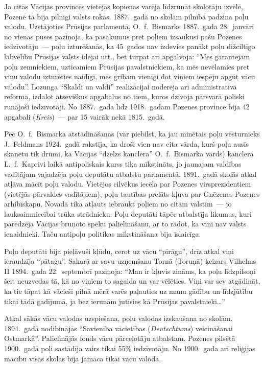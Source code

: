 \documentclass[twoside,a5paper,12pt,fleqn,openany]{extbook}
\newcommand{\detxti}[1]{\textit{\textgerman{#1}}}
\begin{document}
Ja citās Vācijas provincēs vietējās kopienas varēja līdzrunāt skolotāju izvēlē, Pozenē tā bija pilnīgi valsts rokās. 1887.~gadā no skolām pilnībā padzina poļu valodu. Uzstājoties Prūsijas parlamentā, O.~f.~Bismarks 1887.~gada 28.~janvārī no vienas puses paziņoja, ka pasākumus pret poļiem izsaukusi pašu Pozenes iedzīvotāju~--- poļu izturēšanās, ka 45~gados nav izdevies panākt poļu dižciltīgo labvēlību Prūsijas valsts idejai utt., bet turpat arī apgalvoja: ``Mēs garantējam poļu zemniekiem, uzticamiem Prūsijas pavalstniekiem, ka mēs nevēlamies pret viņu valodu izturēties naidīgi, mēs gribam vienīgi dot viņiem iespēju apgūt vācu valodu''. Lozunga ``Skaldi un valdi'' realizācijai noderēja arī administratīvā reforma, izdalot atsevišķus apgabalus no tiem, kuros dzīvoja pārsvarā poliski runājoši iedzīvotāji. No 1887.~gada līdz 1918.~gadam Pozenes provincē bija 42 apgabali (\detxti{Kreis})~--- par 15 vairāk nekā 1815.~gadā.

Pēc O.~f.~Bismarka atstādināšanas (var piebilst, ka jau minētais poļu vēsturnieks J.~Feldmans 1924.~gadā rakstīja, ka droši vien nav cita vārda, kurš poļu ausīs skanētu tik drūmi, kā Vācijas ``dzelzs kanclera'' O.~f.~Bismarka vārds) kanclera L.~f.~Kaprivi laikā antipoliskais kurss tika mīkstināts, jo jaunajam valdības vadītājam vajadzēja poļu deputātu atbalstu parlamentā. 1891.~gadā skolās atkal atļāva mācīt poļu valodu. Vietējos cilvēkus iecēla par Pozenes virsprezidentiem (vietējās pārvaldes vadītājiem), poļu tautības prelāts kļuva par Gnēzenes-Pozenes arhibīskapu. Novadā tika atļauts iebraukt poļiem no citām valstīm~--- jo lauksaimniecībai trūka strādnieku. Poļu deputāti tāpēc atbalstīja likumus, kuri paredzēja Vācijas bruņoto spēku palielināšanu, ar to rādot, ka viņi nav valsts ienaidnieki. Taču antipoļu politikas mīkstināšana bija īslaicīga.

Poļu deputāti bija pieļāvuši kļūdu, cerot uz vācu ``pīrāgu'', drīz atkal viņi ieraudzīja ``pātagu''. Sakarā ar savu uzņemšanu Tornā (Toruņā) ķeizars Vilhelms II 1894.~gada 22.~septembrī paziņoja: ``Man ir kļuvis zināms, ka poļu līdzpilsoņi šeit neuzvedas tā, kā no viņiem to sagaida un var vēlēties. Viņi var sev atgādināt, ka tie tāpat kā vācieši pilnā mērā varēs paļauties uz manu gādību un līdzjūtību tikai tādā gadījumā, ja bez ierunām jutīsies kā Prūsijas pavalstnieki\dots{}''

Atkal sākās vācu valodas uzspiešana, poļu valodas izskaušana no skolām. 1894.~gadā nodibinājās ``Savienība vācietības (\detxti{Deutschtums}) veicināšanai Ostmarkā''. Palielinājās fonds vācu pārceļotāju atbalstam. Pozenes pilsētā 1900.~gadā poļi sastādīja vairs tikai 55\% iedzīvotāju. No 1900.~gada arī reliģijas mācību visās skolās bija jāmāca tikai vācu valodā.
\end{document}
